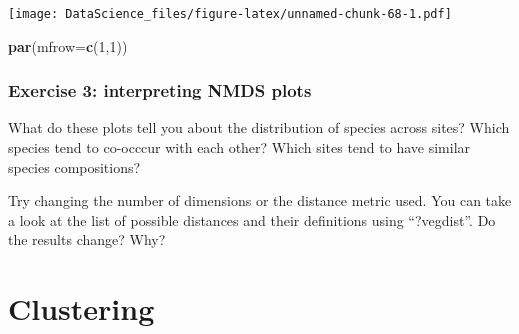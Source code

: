 \documentclass[
]{book}
\newenvironment{Shaded}{\begin{snugshade}}{\end{snugshade}}
\newcommand{\DataTypeTok}[1]{\textcolor[rgb]{0.13,0.29,0.53}{#1}}
\newcommand{\DecValTok}[1]{\textcolor[rgb]{0.00,0.00,0.81}{#1}}
\newcommand{\KeywordTok}[1]{\textcolor[rgb]{0.13,0.29,0.53}{\textbf{#1}}}
\newcommand{\NormalTok}[1]{#1}
\begin{document}
\texttt{[image: DataScience\_files/figure-latex/unnamed-chunk-68-1.pdf]}

\begin{Shaded}
\begin{Highlighting}[]
\KeywordTok{par}\NormalTok{(}\DataTypeTok{mfrow=}\KeywordTok{c}\NormalTok{(}\DecValTok{1}\NormalTok{,}\DecValTok{1}\NormalTok{))}
\end{Highlighting}
\end{Shaded}

\hypertarget{exercise-3-interpreting-nmds-plots}{%
\subsection{Exercise 3: interpreting NMDS plots}\label{exercise-3-interpreting-nmds-plots}}

What do these plots tell you about the distribution of species across sites? Which species tend to co-occcur with each other? Which sites tend to have similar species compositions?

Try changing the number of dimensions or the distance metric used. You can take a look at the list of possible distances and their definitions using ``?vegdist''. Do the results change? Why?

\hypertarget{clustering}{%
\chapter{Clustering}\label{clustering}}

  
\end{document}
